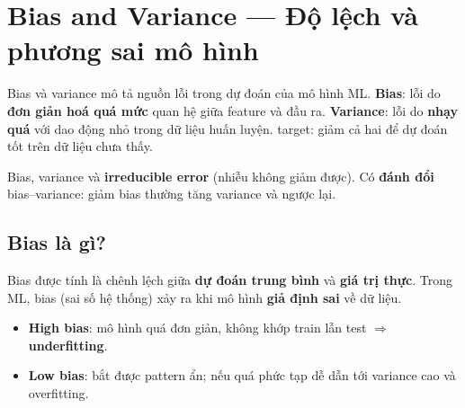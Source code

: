 \section{Bias and Variance --- Độ lệch và phương sai mô hình}
\label{sec:bias-variance}

\begin{dongco}[title={Hai nguồn sai số chính}]
Bias và variance mô tả nguồn lỗi trong dự đoán của mô hình ML.
\textbf{Bias}: lỗi do \textbf{đơn giản hoá quá mức} quan hệ giữa feature và đầu ra.
\textbf{Variance}: lỗi do \textbf{nhạy quá} với dao động nhỏ trong dữ liệu huấn luyện.
target: giảm cả hai để dự đoán tốt trên dữ liệu chưa thấy.
\end{dongco}

\begin{ynghia}[title={Ba thành phần lỗi}]
Bias, variance và \textbf{irreducible error} (nhiễu không giảm được).
Có \textbf{đánh đổi} bias--variance: giảm bias thường tăng variance và ngược lại.
\end{ynghia}

\subsection{Bias là gì?}

\begin{dinhnghia}[title={Bias}]
Bias được tính là chênh lệch giữa \textbf{dự đoán trung bình} và \textbf{giá trị thực}.
Trong ML, bias (sai số hệ thống) xảy ra khi mô hình \textbf{giả định sai} về dữ liệu.
\end{dinhnghia}

\begin{ynghia}[title={High bias vs low bias}]
\begin{itemize}
  \item \textbf{High bias}: mô hình quá đơn giản, không khớp train lẫn test $\Rightarrow$ \textbf{underfitting}.
  \item \textbf{Low bias}: bắt được pattern ẩn; nếu quá phức tạp dễ dẫn tới variance cao và overfitting.
\end{itemize}
\end{ynghia}

\begin{vidu}[title={Minh hoạ bias cao / thấp}]
\end{vidu}


